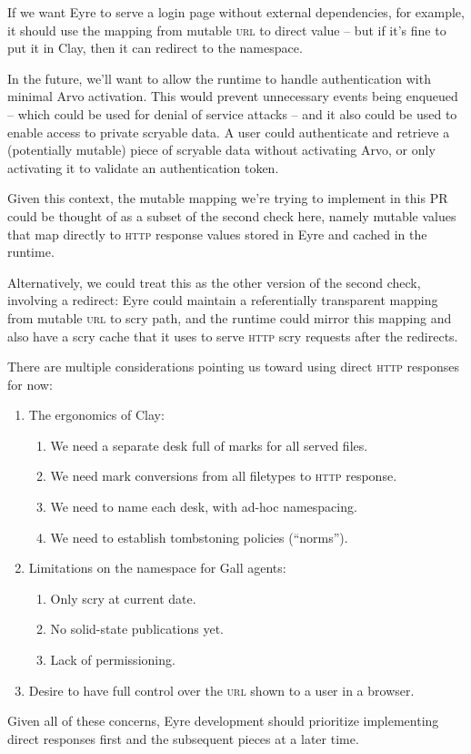 \documentclass[twoside]{article}
\begin{document}
If we want Eyre to serve a login page without external dependencies, for example, it should use the mapping from mutable \textsc{url} to direct value – but if it's fine to put it in Clay, then it can redirect to the namespace.

In the future, we'll want to allow the runtime to handle authentication with minimal Arvo activation.  This would prevent unnecessary events being enqueued – which could be used for denial of service attacks – and it also could be used to enable access to private scryable data.  A user could authenticate and retrieve a (potentially mutable) piece of scryable data without activating Arvo, or only activating it to validate an authentication token.

Given this context, the mutable mapping we're trying to implement in this PR could be thought of as a subset of the second check here, namely mutable values that map directly to \textsc{http} response values stored in Eyre and cached in the runtime.

Alternatively, we could treat this as the other version of the second check, involving a redirect: Eyre could maintain a referentially transparent mapping from mutable \textsc{url} to scry path, and the runtime could mirror this mapping and also have a scry cache that it uses to serve \textsc{http} scry requests after the redirects.

There are multiple considerations pointing us toward using direct \textsc{http} responses for now:

\begin{enumerate}
  \item  The ergonomics of Clay:
  \begin{enumerate}
    \item  We need a separate desk full of marks for all served files.
    \item  We need mark conversions from all filetypes to \textsc{http} response.
    \item  We need to name each desk, with ad-hoc namespacing.
    \item  We need to establish tombstoning policies (``norms'').
  \end{enumerate}
  \item  Limitations on the namespace for Gall agents:
  \begin{enumerate}
    \item  Only scry at current date.
    \item  No solid-state publications yet.
    \item  Lack of permissioning.
  \end{enumerate}
  \item  Desire to have full control over the \textsc{url} shown to a user in a browser.
\end{enumerate}

Given all of these concerns, Eyre development should prioritize implementing direct responses first and the subsequent pieces at a later time.\tombstone{}

\printbibliography
\afterpage{\blankpage}
\end{document}
